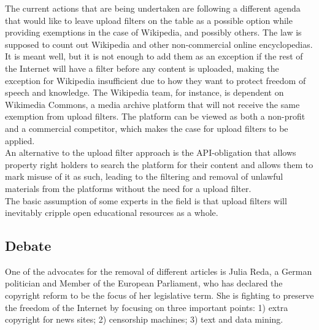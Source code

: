 \documentclass[a4paper]{article}
\begin{document}
\noindent
The current actions that are being undertaken are following a different agenda that would like to leave upload filters on the table as a possible option while providing exemptions in the case of Wikipedia, and possibly others. The law is supposed to count out Wikipedia and other non-commercial online encyclopedias. It is meant well, but it is not enough to add them as an exception if the rest of the Internet will have a filter before any content is uploaded, making the exception for Wikipedia insufficient due to how they want to protect freedom of speech and knowledge. The Wikipedia team, for instance, is dependent on Wikimedia Commons, a media archive platform that will not receive the same exemption from upload filters. The platform can be viewed as both a non-profit and a commercial competitor, which makes the case for upload filters to be applied. \\

\noindent
An alternative to the upload filter approach is the API-obligation that allows property right holders to search the platform for their content and allows them to mark misuse of it as such, leading to the filtering and removal of unlawful materials from the platforms without the need for a upload filter. \\

\noindent
The basic assumption of some experts in the field is that upload filters will inevitably cripple open educational resources as a whole.

\subsection{Debate}

One of the advocates for the removal of different articles is Julia Reda, a German politician and Member of the European Parliament, who has declared the copyright reform to be the focus of her legislative term. She is fighting to preserve the freedom of the Internet by focusing on three important points: 1) extra copyright for news sites; 2) censorship machines; 3) text and data mining. 
\end{document}

